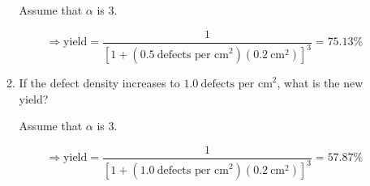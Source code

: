 \documentclass[fleqn]{article}
\begin{document}
\begin{enumerate}
\begin{enumerate}
			Assume that $\alpha$ is 3.
			
			\begin{equation*}
				\Rightarrow \text{yield} = \frac{1}{[1 + (0.5\ \text{defects per cm}^2)(0.2\ \text{cm}^2)]^3} = \mathbf{75.13\%}
			\end{equation*}
			
			\item If the defect density increases to $1.0\ \text{defects per cm}^2$, what is the new yield?
			
			Assume that $\alpha$ is 3.
			
			\begin{equation*}
				\Rightarrow \text{yield} = \frac{1}{[1 + (1.0\ \text{defects per cm}^2)(0.2\ \text{cm}^2)]^3} = \mathbf{57.87\%}
			\end{equation*}
			
		\end{enumerate}
	\end{enumerate}
\end{document}
